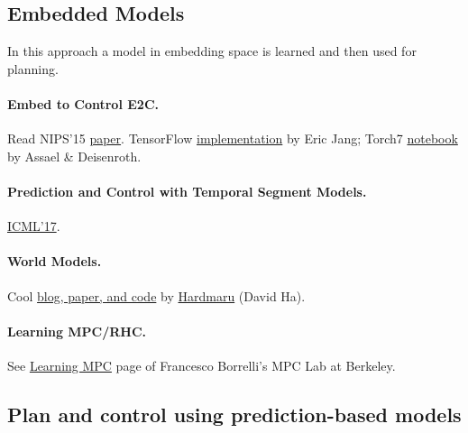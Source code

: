 \documentclass[12pt]{article}
\numberwithin{equation}{section}
\begin{document}
\subsection{Embedded Models}

In this approach a model in embedding space is learned and then used for planning. 

\paragraph{Embed to Control E2C.}

Read NIPS'15 \href{https://papers.nips.cc/paper/5964-embed-to-control-a-locally-linear-latent-dynamics-model-for-control-from-raw-images}{paper}. TensorFlow \href{https://github.com/ericjang/e2c}{implementation} by Eric Jang; Torch7 \href{https://github.com/iassael/torch-e2c}{notebook} by Assael \& Deisenroth. 

\paragraph{Prediction and Control with Temporal Segment Models.} \href{https://icml.cc/Conferences/2017/Schedule?showParentSession=1057}{ICML'17}.

\paragraph{World Models.} Cool \href{https://worldmodels.github.io/}{blog, paper, and code} by \href{http://blog.otoro.net/}{Hardmaru} (David Ha).

\paragraph{Learning MPC/RHC.}

See \href{http://www.mpc.berkeley.edu/research/adaptive-and-learning-predictive-control}{Learning MPC} page of Francesco Borrelli's MPC Lab at Berkeley.


\subsection{Plan and control using prediction-based models}
\end{document}
